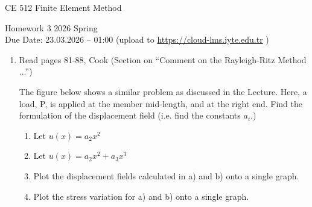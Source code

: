 \documentclass[11pt, a4paper]{article}
\begin{document}
\begin{center}
    CE 512 Finite Element Method
\end{center}
\vspace{-0.6cm}
Homework 3 \hfill 2026 Spring \hfill \null \\
Due Date: 23.03.2026 -- 01:00 \hfill (upload to \url{https://cloud-lms.iyte.edu.tr} )

\vspace{0.8cm}

\begin{enumerate}[label=\arabic*., leftmargin=*]
    \item Read pages 81-88, Cook (Section on ``Comment on the Rayleigh-Ritz Method ...'')

    \vspace{0.3cm}
    The figure below shows a similar problem as discussed in the Lecture. Here, a load, P, is applied at the member mid-length, and at the right end. Find the formulation of the displacement field (i.e. find the constants $a_i$.)

    \vspace{0.2cm}
    \begin{enumerate}[label=\alph*)]
        \item Let $u(x) = a_2 x^2$
        \item Let $u(x) = a_2 x^2 + a_3 x^3$
        \item Plot the displacement fields calculated in a) and b) onto a single graph.
        \item Plot the stress variation for a) and b) onto a single graph.
    \end{enumerate}

    \vspace{0.6cm}
    \begin{center}
\end{center}
\end{enumerate}
\end{document}
